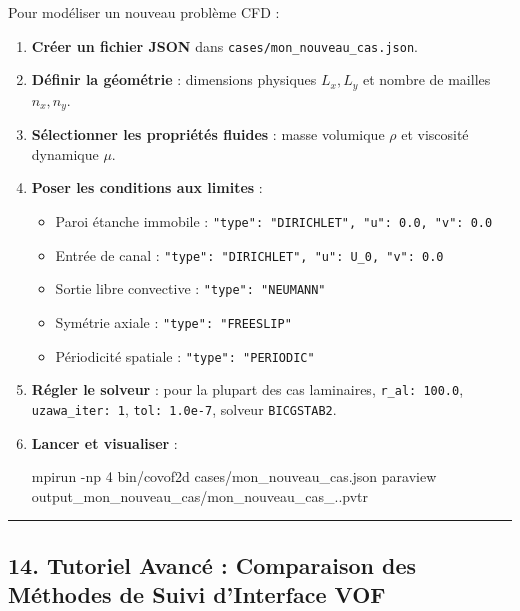 \documentclass[
  french,
]{article}
\newenvironment{Shaded}{}{}
\newcommand{\AttributeTok}[1]{\textcolor[rgb]{0.49,0.56,0.16}{#1}}
\newcommand{\ExtensionTok}[1]{#1}
\newcommand{\NormalTok}[1]{#1}
\providecommand{\tightlist}{%
  \setlength{\itemsep}{0pt}\setlength{\parskip}{0pt}}
\begin{document}
Pour modéliser un nouveau problème CFD :

\begin{enumerate}
\def\labelenumi{\arabic{enumi}.}
\item
  \textbf{Créer un fichier JSON} dans
  \texttt{cases/mon\_nouveau\_cas.json}.
\item
  \textbf{Définir la géométrie} : dimensions physiques \(L_x, L_y\) et
  nombre de mailles \(n_x, n_y\).
\item
  \textbf{Sélectionner les propriétés fluides} : masse volumique
  \(\rho\) et viscosité dynamique \(\mu\).
\item
  \textbf{Poser les conditions aux limites} :

  \begin{itemize}
  \tightlist
  \item
    Paroi étanche immobile :
    \texttt{"type":\ "DIRICHLET",\ "u":\ 0.0,\ "v":\ 0.0}
  \item
    Entrée de canal :
    \texttt{"type":\ "DIRICHLET",\ "u":\ U\_0,\ "v":\ 0.0}
  \item
    Sortie libre convective : \texttt{"type":\ "NEUMANN"}
  \item
    Symétrie axiale : \texttt{"type":\ "FREESLIP"}
  \item
    Périodicité spatiale : \texttt{"type":\ "PERIODIC"}
  \end{itemize}
\item
  \textbf{Régler le solveur} : pour la plupart des cas laminaires,
  \texttt{r\_al:\ 100.0}, \texttt{uzawa\_iter:\ 1},
  \texttt{tol:\ 1.0e-7}, solveur \texttt{BICGSTAB2}.
\item
  \textbf{Lancer et visualiser} :

\begin{Shaded}
\begin{Highlighting}[]
\ExtensionTok{mpirun} \AttributeTok{{-}np}\NormalTok{ 4 bin/covof2d cases/mon\_nouveau\_cas.json}
\ExtensionTok{paraview}\NormalTok{ output\_mon\_nouveau\_cas/mon\_nouveau\_cas\_..pvtr}
\end{Highlighting}
\end{Shaded}
\end{enumerate}

\begin{center}\rule{0.5\linewidth}{0.5pt}\end{center}

\subsection{14. Tutoriel Avancé : Comparaison des Méthodes de Suivi
d'Interface
VOF}\label{tutoriel-avancuxe9-comparaison-des-muxe9thodes-de-suivi-dinterface-vof}
\end{document}
